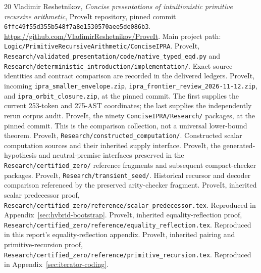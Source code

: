 \documentclass[11pt]{article}
\theoremstyle{definition}\newtheorem{definition}[theorem]{Definition}
\theoremstyle{remark}\newtheorem{remark}[theorem]{Remark}
\newcommand{\file}[1]{\nolinkurl{#1}}
\newcommand{\Repo}{\url{https://github.com/VladimirReshetnikov/ProveIt}}
\begin{document}
\clearpage
\begin{thebibliography}{20}
 Vladimir Reshetnikov, \emph{Concise presentations of intuitionistic
primitive recursive arithmetic}, ProveIt repository, pinned commit
\texttt{6ffc49f55d355b548f7a8e1530570aee5de086b3}. \Repo.
Main project path: \file{Logic/PrimitiveRecursiveArithmetic/ConciseIPRA}.
 ProveIt, \file{Research/validated_presentation/code/native_typed_eqd.py}
and \file{Research/deterministic_introduction/implementation/}. Exact source
identities and contract comparison are recorded in the delivered ledgers.
 ProveIt, incoming \file{ipra_smaller_envelope.zip},
\file{ipra_frontier_review_2026-11-12.zip}, and \file{ipra_orbit_closure.zip},
at the pinned commit. The first supplies the current 253-token and
275-AST coordinates; the last supplies the independently rerun corpus audit.
 ProveIt, the ninety \file{ConciseIPRA/Research/} packages,
at the pinned commit. This is the comparison collection, not a universal
lower-bound theorem.
 ProveIt, \file{Research/constructed_computation/}.
Constructed scalar computation sources and their inherited supply interface.
 ProveIt, the generated-hypothesis and neutral-premise
interfaces preserved in the \file{Research/certified_zero/} reference
fragments and subsequent compact-checker packages.
 ProveIt, \file{Research/transient_seed/}.
Historical recursor and decoder comparison referenced by the preserved
arity-checker fragment.
 ProveIt, inherited scalar predecessor proof,
\file{Research/certified_zero/reference/scalar_predecessor.tex}.
Reproduced in Appendix~\ref{sec:hybrid-bootstrap}.
 ProveIt, inherited equality-reflection proof,
\file{Research/certified_zero/reference/equality_reflection.tex}.
Reproduced in this report's equality-reflection appendix.
 ProveIt, inherited pairing and primitive-recursion proof,
\file{Research/certified_zero/reference/primitive_recursion.tex}.
Reproduced in Appendix~\ref{sec:iterator-coding}.
\end{thebibliography}
\end{document}
